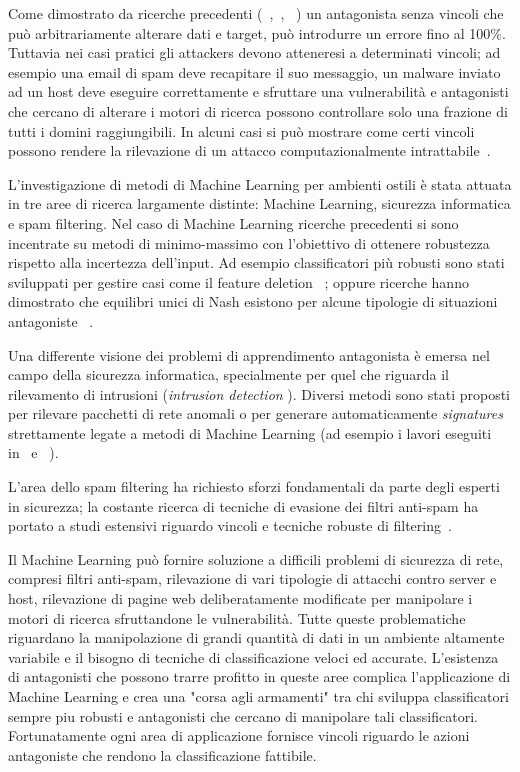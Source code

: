 Come dimostrato da ricerche precedenti (~\cite{kearnsli},~\cite{Auer2002},~\cite{paclearning} ) un antagonista senza vincoli che può arbitrariamente alterare dati e target, può introdurre un errore fino al 100\%. Tuttavia nei casi pratici gli attackers devono atteneresi a determinati vincoli; ad esempio una email di spam deve recapitare il suo messaggio, un malware inviato ad un host deve eseguire correttamente e sfruttare una vulnerabilità e antagonisti che cercano di alterare i motori di ricerca possono controllare solo una frazione di tutti i domini raggiungibili. In alcuni casi si può mostrare come certi vincoli possono rendere la rilevazione di un attacco computazionalmente intrattabile~\cite{fogla}.

L'investigazione di metodi di Machine Learning per ambienti ostili è stata attuata in tre aree di ricerca largamente distinte: Machine Learning, sicurezza informatica e spam filtering. Nel caso di Machine Learning ricerche precedenti si sono incentrate su metodi di minimo-massimo con l'obiettivo di ottenere robustezza rispetto alla incertezza dell'input. Ad esempio classificatori più robusti sono stati sviluppati per gestire casi come il feature deletion~\cite{globerson} ; oppure ricerche hanno dimostrato che equilibri unici di Nash esistono per alcune tipologie di situazioni antagoniste~\cite{nash} .

Una differente visione dei problemi di apprendimento antagonista è emersa nel campo della sicurezza informatica, specialmente per quel che riguarda il rilevamento di intrusioni (\textit{intrusion detection} ). Diversi metodi sono stati proposti per rilevare pacchetti di rete anomali o per generare automaticamente \textit{signatures} strettamente legate a metodi di Machine Learning (ad esempio i lavori eseguiti in~\cite{wangstolfo} e~\cite{wang2006} ).

L'area dello spam filtering ha richiesto sforzi fondamentali da parte degli esperti in sicurezza; la costante ricerca di tecniche di evasione dei filtri anti-spam ha portato a studi estensivi riguardo vincoli e tecniche robuste di filtering~\cite{dalvi}. 

Il Machine Learning può fornire soluzione a difficili problemi di sicurezza di rete, compresi filtri anti-spam, rilevazione di vari tipologie di attacchi contro server e host, rilevazione di pagine web 
deliberatamente modificate per manipolare i motori di ricerca sfruttandone le vulnerabilità. Tutte queste problematiche riguardano la manipolazione di grandi quantità di dati in un ambiente altamente variabile e il bisogno di tecniche di classificazione veloci ed accurate. L'esistenza di antagonisti che possono trarre profitto in queste aree complica l'applicazione di Machine Learning e crea una "corsa agli armamenti" tra chi sviluppa classificatori sempre piu robusti e antagonisti che cercano di manipolare tali classificatori. Fortunatamente ogni area di applicazione fornisce vincoli riguardo le azioni antagoniste che rendono la classificazione fattibile. 

